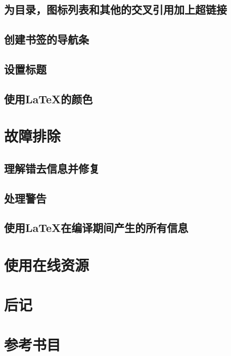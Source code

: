 \documentclass{book}
\begin{document}
	\section{为目录，图标列表和其他的交叉引用加上超链接}
	\section{创建书签的导航条}
	\section{设置标题}
	\section{使用LaTeX的颜色}
\chapter{故障排除}
	\section{理解错去信息并修复}
	\section{处理警告}
	\section{使用LaTeX在编译期间产生的所有信息}
\chapter{使用在线资源}
\appendix
\chapter{后记}
\chapter{参考书目}
\end{document}
